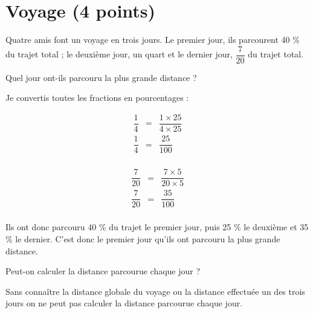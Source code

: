 \section{Voyage (4 points)}

Quatre amis font un voyage en trois jours. Le premier jour, ils parcourent 40 \% du trajet total ; le deuxième jour, un quart et le dernier jour, $\dfrac{7}{20}$ du trajet total.

\begin{questions}
	\question[2] Quel jour ont-ils parcouru la plus grande distance ?
	
	\begin{solution}
		Je convertis toutes les fractions en pourcentages :
		
		\begin{eqnarray*}
			\dfrac{1}{4} &=& \dfrac{1 \times 25}{4 \times 25}\\
			\dfrac{1}{4} &=& \dfrac{25}{100}\\
		\end{eqnarray*}
	
		\begin{eqnarray*}
			\dfrac{7}{20} &=& \dfrac{7 \times 5}{20 \times 5}\\
			\dfrac{7}{20} &=& \dfrac{35}{100}\\
		\end{eqnarray*}
	
		Ils ont donc parcouru 40 \% du trajet le premier jour, puis 25 \% le deuxième et 35 \% le dernier. C'est donc le premier jour qu'ils ont parcouru la plus grande distance.
	\end{solution}
	
	\question[2] Peut-on calculer la distance parcourue chaque jour ?
	
	\begin{solution}
		Sans connaître la distance globale du voyage ou la distance effectuée un des trois jours on ne peut pas calculer la distance parcourue chaque jour.
	\end{solution}
\end{questions}